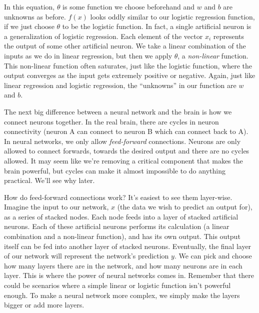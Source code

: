\documentclass[a4paper,10pt]{article}
\begin{document}
In this equation, $\theta$
is some function we choose beforehand
and $w$ and $b$ are unknowns as before.
$f(x)$ looks oddly similar to our
logistic regression function,
if we just choose $\theta$ 
to be the logistic function.
In fact, a single artificial neuron
is a generalization of logistic regression.
Each element of the vector $x_i$
represents the output of some
other artificial neuron.
We take a linear combination of the inputs
as we do in linear regression, but then we apply
$\theta$, a \emph{non-linear} function.
This non-linear function often saturates,
just like the logistic function,
where the output converges as
the input gets extremely positive or negative.
Again, just like linear regression and
logistic regression, the ``unknowns''
in our function are $w$ and $b$.


The next big difference between
a neural network and the brain
is how we connect neurons together.
In the real brain,
there are cycles in neuron connectivity
(neuron A can connect to neuron B which
can connect back to A). In
neural networks, we only allow
\emph{feed-forward} connections.
Neurons are only allowed to connect
forwards, towards the desired output
and there are no cycles allowed.
It may seem like we're removing
a critical component that makes the brain powerful,
but cycles can make it almost impossible
to do anything practical. We'll see why later.

How do feed-forward connections work?
It's easiest to see them layer-wise.
Imagine the input to our network, $x$ (the data
we wish to predict an output for),
as a series of stacked nodes.
Each node feeds into a layer of stacked artificial neurons.
Each of these artificial neurons performs its calculation (a linear combination
and a non-linear function), and has its own output.
This output itself can be fed into another layer of
stacked neurons. Eventually, the final layer of our network
will represent the network's prediction $y$.
We can pick and choose how many layers
there are in the network, and how many neurons
are in each layer. This is where
the power of neural networks comes in. Remember
that there could be scenarios where
a simple linear or logistic function isn't
powerful enough. To make a neural network
more complex, we simply make the layers
bigger or add more layers.
\end{document}
